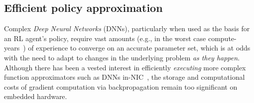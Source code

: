 \documentclass[
sigconf,natbib=false
]{acmart}
\begin{document}
\subsection{Efficient policy approximation}
Complex \emph{Deep Neural Networks} (DNNs), particularly when used as the basis for an RL agent's policy, require vast amounts (e.g., in the worst case compute-years~\parencite{DBLP:journals/corr/abs-1912-06680}) of experience to converge on an accurate parameter set, which is at odds with the need to adapt to changes in the underlying problem \emph{as they happen}.
Although there has been a vested interest in efficiently \emph{executing} more complex function approximators such as DNNs in-NIC~\parencite{DBLP:journals/corr/abs-2002-08987,DBLP:journals/corr/abs-2009-02353,DBLP:conf/sigcomm/SanvitoSB18,DBLP:journals/corr/abs-1801-05731,langlet-ml-netronome}, the storage and computational costs of gradient computation via backpropagation remain too significant on embedded hardware.

\end{document}

